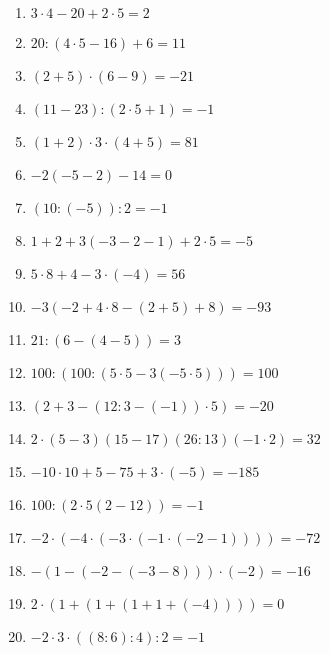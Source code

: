 \newpage
\begin{Answer}[ref=einfachesRechnenA1]

	\begin{minipage}{\textwidth}
		\begin{minipage}{0.46\textwidth}
			\begin{enumerate}[label=\alph*)]
				\item \(3\cdot 4-20+2\cdot 5=2\)
				\item \(20:\left( 4\cdot 5-16\right) +6=11\)
				\item \(\left( 2+5\right) \cdot \left( 6-9\right) =-21\)
				\item \(\left( 11-23\right) :\left( 2\cdot 5+1\right) =-1\)
				\item \(\left( 1+2\right) \cdot3\cdot\left( 4+5\right) =81\)
				\item \(-2\left( -5-2\right) -14=0\)
				\item \(\left( 10:\left( -5\right)\right)  :2=-1\)
				\item \(1+2+3\left( -3-2-1\right) +2\cdot 5=-5\)
				\item \(5\cdot 8+4-3\cdot \left( -4\right) =56\)
				\item \(-3\left( -2+4\cdot 8-\left( 2+5\right) +8\right) =-93\)
				\item \(21:\left( 6-\left( 4-5\right) \right) =3\)
				\item \(100:\left( 100:\left( 5\cdot 5-3\left( -5\cdot 5\right) \right) \right) =100\)
				\item \(\left( 2+3-\left( 12:3-\left( -1\right) \right)\cdot 5 \right) =-20\)
			\end{enumerate}
		\end{minipage}%
		\begin{minipage}{0.54\textwidth}
			\begin{enumerate}[label=\alph*)]
				\setcounter{enumi}{13}
				\item \(2\cdot\left(5-3\right) \left( 15-17\right) \left( 26:13\right) \left( -1\cdot 2\right) = 32\)
				\item \(-10\cdot 10+5-75+3\cdot\left( -5\right) =-185\)
				\item \(100:(2\cdot 5(2-12))=-1\)
				\item \(-2\cdot(-4\cdot (-3\cdot (-1\cdot (-2-1))))=-72\)
				\item \(-(1-(-2-(-3-8)))\cdot (-2)=-16\)
				\item \(2\cdot(1+(1+(1+1+(-4))))=0\)
				\item \(-2\cdot 3\cdot ((8:6):4):2=-1\)

\end{enumerate}
\end{minipage}
\end{minipage}
\end{Answer}
